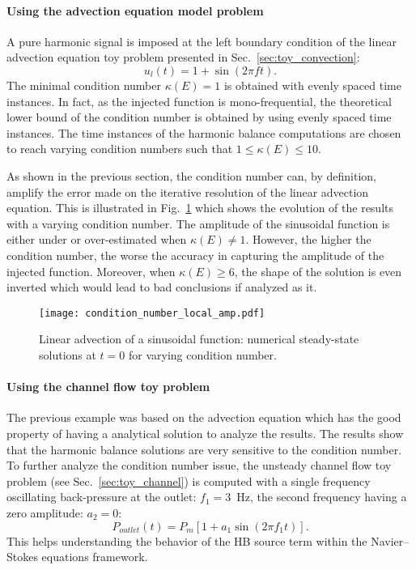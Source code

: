 \paragraph{Using the advection equation model problem}

A pure harmonic signal is imposed at the left boundary condition
of the linear advection equation toy problem presented in Sec.~\ref{sec:toy_convection}:
\begin{equation}
   u_l (t) = 1 + \sin \left(2 \pi f t\right).
\end{equation}
The minimal condition number
$\kappa(E) = 1$ is obtained with evenly spaced time instances.
In fact, as the injected function is mono-frequential, 
the theoretical lower bound of the condition number is obtained by using evenly
spaced time instances.
The time instances of the harmonic balance
computations are chosen to reach varying condition numbers
such that $1 \leq \kappa (E) \leq 10$.  

As shown in the previous section, the condition number 
can, by definition, amplify the error made
on the iterative resolution of the linear advection equation.
This is illustrated in Fig.~\ref{fig:condition_number_local_amp} which 
shows the evolution of the results with a varying condition number.
The amplitude of the
sinusoidal function is either under or over-estimated when
$\kappa (E) \neq 1$. However, 
the higher the condition number, the worse the accuracy in capturing
the amplitude of the injected function. Moreover, when $\kappa(E) \geq 6$,
the shape of the solution is even inverted which would lead to
bad conclusions if analyzed as it.
\begin{figure}[htp]
  \centering
  \texttt{[image: condition\_number\_local\_amp.pdf]}
  \caption{Linear advection of a sinusoidal function: numerical steady-state 
  solutions at $t=0$ for varying condition number.}
  \label{fig:condition_number_local_amp}
\end{figure}

\paragraph{Using the channel flow toy problem}
The previous example was based on the advection equation which
has the good property of having a analytical solution to 
analyze the results. The results show that the harmonic
balance solutions are very sensitive to the condition number.
To further analyze the condition number issue,
the unsteady channel flow toy problem
(see Sec.~\ref{sec:toy_channel}) is computed with a single
frequency oscillating back-pressure 
at the outlet: $f_1 = 3$~Hz, the second
frequency having a zero amplitude: $a_2= 0$:
\begin{equation}
   P_{outlet} (t) = P_m \left[ 1 + a_1 \sin \left(2 \pi f_1 t\right) \right].
\end{equation}
This helps understanding the behavior of the HB source term
within the Navier--Stokes equations framework.

